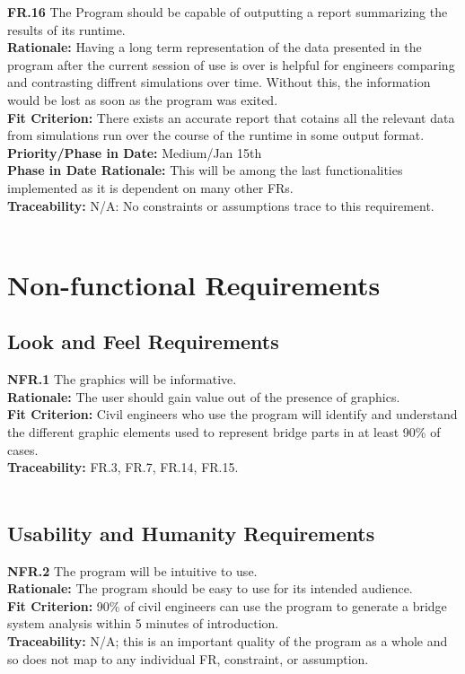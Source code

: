 \documentclass[12pt]{article}
\begin{document}
  \noindent\textbf{FR.16} The Program should be capable of outputting a report summarizing the results of its runtime.\\
  \textbf{Rationale:} Having a long term representation of the data presented in the program after the current session of use is over is helpful for engineers comparing
  and contrasting diffrent simulations over time. Without this, the information would be lost as soon as the program was exited.\\
  \textbf{Fit Criterion:} There exists an accurate report that cotains all the relevant data from simulations run over the course of the runtime in some output format.\\
  \textbf{Priority/Phase in Date:} Medium/Jan 15th\\
  \textbf{Phase in Date Rationale:} This will be among the last functionalities implemented as it is dependent on many other FRs.\\
  \textbf{Traceability:} N/A: No constraints or assumptions trace to this requirement.\\\\


\section{Non-functional Requirements}

\subsection{Look and Feel Requirements}

  \textbf{NFR.1} The graphics will be informative.\\
  \textbf{Rationale:} The user should gain value out of the presence of graphics.\\
  \textbf{Fit Criterion:} Civil engineers who use the program will identify and understand the different graphic elements used to represent bridge parts in at least 90\% of cases.\\
  \textbf{Traceability:} FR.3, FR.7, FR.14, FR.15.\\\\

\subsection{Usability and Humanity Requirements}

  \textbf{NFR.2} The program will be intuitive to use.\\
  \textbf{Rationale:} The program should be easy to use for its intended audience.\\
  \textbf{Fit Criterion:} 90\% of civil engineers can use the program to generate a bridge system analysis within 5 minutes of introduction.\\
  \textbf{Traceability:} N/A; this is an important quality of the program as a whole and so does not map to any individual FR, constraint, or assumption.\\\\
\end{document}
